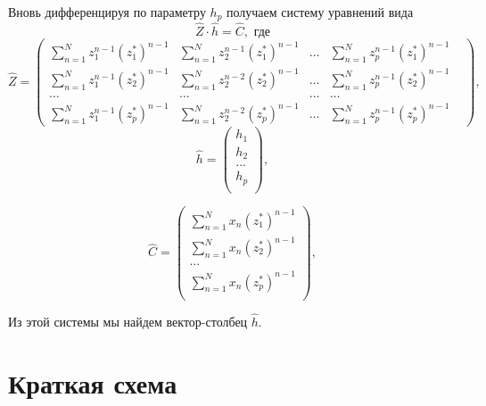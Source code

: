 \documentclass[a4paper,14pt]{extarticle}
\begin{document}
Вновь дифференцируя  по параметру $h_p$ получаем систему уравнений
вида 
 \begin{equation}
    \label{eq:}
    \boxed{\hat Z \cdot \hat h = \hat C}, \text{ где}
\end{equation}
\begin{equation}
    \label{eq:}
    \hat Z = 
    \begin{pmatrix}
        \sum\limits_{n=1}^{N} z_1^{n-1} (z_1^*)^{n-1} &
        \sum\limits_{n=1}^{N} z_2^{n-1} (z_1^*)^{n-1} &
        \dots &
        \sum\limits_{n=1}^{N} z_p^{n-1} (z_1^*)^{n-1} &
        \\
        \sum\limits_{n=1}^{N} z_1^{n-1} (z_2^*)^{n-1} &
        \sum\limits_{n=1}^{N} z_2^{n-2} (z_2^*)^{n-1} &
        \dots &
        \sum\limits_{n=1}^{N} z_p^{n-1} (z_2^*)^{n-1} &
        \\
        \dots & \dots & \dots & \dots &
        \\
        \sum\limits_{n=1}^{N} z_1^{n-1} (z_p^*)^{n-1} &
        \sum\limits_{n=1}^{N} z_2^{n-2} (z_p^*)^{n-1} &
        \dots &
        \sum\limits_{n=1}^{N} z_p^{n-1} (z_p^*)^{n-1} &
    \end{pmatrix},
\end{equation}
\begin{equation}
    \label{eq:}
    \hat h = 
    \begin{pmatrix}
        h_1 \\ 
        h_2 \\ 
        \dots \\ 
        h_p \\ 
    \end{pmatrix},
\end{equation}

\begin{equation}
    \label{eq:}
    \hat C = 
    \begin{pmatrix}
        \sum\limits_{n=1}^{N} x_n (z_1^*)^{n-1} \\ 
        \sum\limits_{n=1}^{N} x_n (z_2^*)^{n-1} \\ 
        \dots \\
        \sum\limits_{n=1}^{N} x_n (z_p^*)^{n-1} \\ 
    \end{pmatrix},
\end{equation}

Из этой системы мы найдем вектор-столбец $\hat h$.

\section{Краткая схема}%
\label{sec:kratkaia_skhema}
\end{document}
